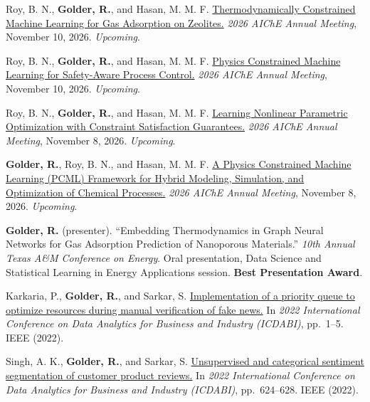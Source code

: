 \documentclass[11pt,letterpaper,sans]{moderncv}
\newlength{\cvcontentindent}
\begin{document}
\par{}\vspace{0.10em}{\small\itshape\textcolor{cvsoft}{Conference Proceedings}}\par\vspace{0.16em}
\begin{list}{}{\setlength{\leftmargin}{\cvcontentindent}\setlength{\labelwidth}{0pt}\setlength{\labelsep}{0pt}\setlength{\itemsep}{0.25em}\setlength{\parsep}{0pt}\setlength{\topsep}{0.05em}}\small
\item Roy, B. N., \textbf{Golder, R.}, and Hasan, M. M. F. \href{https://aiche.confex.com/aiche/2026/prelim.cgi/Paper/734563}{Thermodynamically Constrained Machine Learning for Gas Adsorption on Zeolites.} \textit{2026 AIChE Annual Meeting}, November 10, 2026. \textit{Upcoming}.
\item Roy, B. N., \textbf{Golder, R.}, and Hasan, M. M. F. \href{https://aiche.confex.com/aiche/2026/meetingapp.cgi/Paper/738715}{Physics Constrained Machine Learning for Safety-Aware Process Control.} \textit{2026 AIChE Annual Meeting}, November 10, 2026. \textit{Upcoming}.
\item Roy, B. N., \textbf{Golder, R.}, and Hasan, M. M. F. \href{https://aiche.confex.com/aiche/2026/meetingapp.cgi/Paper/734536}{Learning Nonlinear Parametric Optimization with Constraint Satisfaction Guarantees.} \textit{2026 AIChE Annual Meeting}, November 8, 2026. \textit{Upcoming}.
\item \textbf{Golder, R.}, Roy, B. N., and Hasan, M. M. F. \href{https://aiche.confex.com/aiche/2026/prelim.cgi/Paper/736408}{A Physics Constrained Machine Learning (PCML) Framework for Hybrid Modeling, Simulation, and Optimization of Chemical Processes.} \textit{2026 AIChE Annual Meeting}, November 8, 2026. \textit{Upcoming}.
\item \textbf{Golder, R.} (presenter). ``Embedding Thermodynamics in Graph Neural Networks for Gas Adsorption Prediction of Nanoporous Materials.'' \textit{10th Annual Texas A\&M Conference on Energy}. Oral presentation, Data Science and Statistical Learning in Energy Applications session. \textbf{Best Presentation Award}.
\item Karkaria, P., \textbf{Golder, R.}, and Sarkar, S. \href{https://ieeexplore.ieee.org/abstract/document/10041616/}{Implementation of a priority queue to optimize resources during manual verification of fake news.} In \textit{2022 International Conference on Data Analytics for Business and Industry (ICDABI)}, pp.\ 1--5. IEEE (2022).
\item Singh, A. K., \textbf{Golder, R.}, and Sarkar, S. \href{https://ieeexplore.ieee.org/abstract/document/10041699/}{Unsupervised and categorical sentiment segmentation of customer product reviews.} In \textit{2022 International Conference on Data Analytics for Business and Industry (ICDABI)}, pp.\ 624--628. IEEE (2022).
\end{list}
\end{document}
